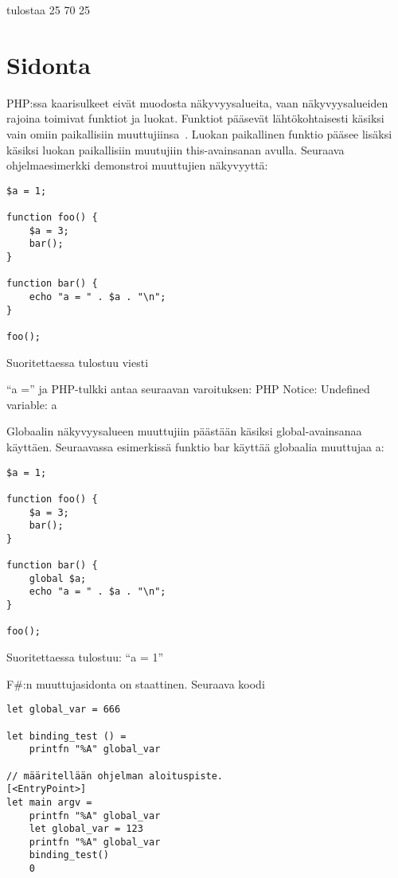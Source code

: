 tulostaa 25 70 25

\section{Sidonta}

PHP:ssa kaarisulkeet eivät muodosta näkyvyysalueita, vaan näkyvyysalueiden rajoina toimivat funktiot ja luokat. Funktiot pääsevät lähtökohtaisesti käsiksi vain omiin paikallisiin muuttujiinsa~\cite{man_php_scope}. Luokan paikallinen funktio pääsee lisäksi käsiksi luokan paikallisiin muutujiin this-avainsanan avulla. Seuraava ohjelmaesimerkki demonstroi muuttujien näkyvyyttä:

\lstset{language=PHP,
	basicstyle=\ttfamily,
	breaklines=true,
	columns=fullflexible}
	
\begin{lstlisting}
$a = 1;

function foo() {
    $a = 3;
    bar();
}

function bar() {
    echo "a = " . $a . "\n";
}

foo();
\end{lstlisting}

Suoritettaessa tulostuu viesti

“a =” ja PHP-tulkki antaa seuraavan varoituksen: PHP Notice:  Undefined variable: a

Globaalin näkyvyysalueen muuttujiin päästään käsiksi global-avainsanaa käyttäen. Seuraavassa esimerkissä funktio bar käyttää globaalia muuttujaa a:

\begin{lstlisting}
$a = 1;

function foo() {
    $a = 3;
    bar();
}

function bar() {
    global $a;
    echo "a = " . $a . "\n";
}

foo();
\end{lstlisting}

Suoritettaessa tulostuu: “a = 1”


F\#:n muuttujasidonta on staattinen. Seuraava koodi

\lstset{
	language=FSharp,
	basicstyle=\ttfamily,
	breaklines=true,
	columns=fullflexible
}

\begin{lstlisting}
let global_var = 666

let binding_test () =
    printfn "%A" global_var

// määritellään ohjelman aloituspiste.
[<EntryPoint>]
let main argv =
    printfn "%A" global_var
    let global_var = 123
    printfn "%A" global_var
    binding_test()
    0
\end{lstlisting}


